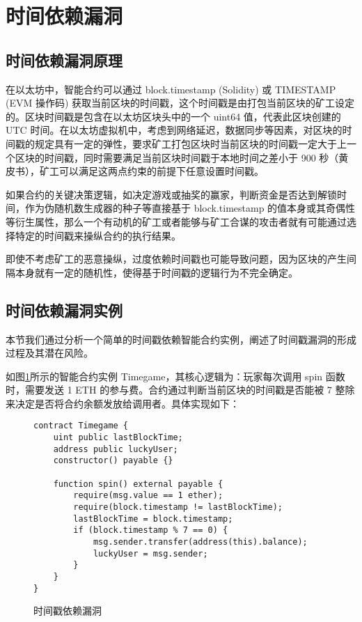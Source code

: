 \documentclass[print, master, vlined, timesmath]{DissertUESTC}
\begin{document}
\section{时间依赖漏洞}
\subsection{时间依赖漏洞原理}

在以太坊中，智能合约可以通过 block.timestamp (Solidity) 或 TIMESTAMP (EVM 操作码) 获取当前区块的时间戳，这个时间戳是由打包当前区块的矿工设定的。区块时间戳是包含在以太坊区块头中的一个 uint64 值，代表此区块创建的 UTC 时间。在以太坊虚拟机中，考虑到网络延迟，数据同步等因素，对区块的时间戳的规定具有一定的弹性，要求矿工打包区块时当前区块的时间戳一定大于上一个区块的时间戳，同时需要满足当前区块时间戳于本地时间之差小于 900 秒（黄皮书），矿工可以满足这两点约束的前提下任意设置时间戳。

如果合约的关键决策逻辑，如决定游戏或抽奖的赢家，判断资金是否达到解锁时间，作为伪随机数生成器的种子等直接基于 block.timestamp 的值本身或其奇偶性等衍生属性，那么一个有动机的矿工或者能够与矿工合谋的攻击者就有可能通过选择特定的时间戳来操纵合约的执行结果。

即使不考虑矿工的恶意操纵，过度依赖时间戳也可能导致问题，因为区块的产生间隔本身就有一定的随机性，使得基于时间戳的逻辑行为不完全确定。

\subsection{时间依赖漏洞实例}
本节我们通过分析一个简单的时间戳依赖智能合约实例，阐述了时间戳漏洞的形成过程及其潜在风险。

如图\ref{fig:timestamp-dependency}所示的智能合约实例 Timegame，其核心逻辑为：玩家每次调用 spin 函数时，需要发送 1 ETH 的参与费。合约通过判断当前区块的时间戳是否能被 7 整除来决定是否将合约余额发放给调用者。具体实现如下：

\begin{figure}[H]
    \centering
    \begin{minipage}{0.9\textwidth}
    \begin{verbatim}
contract Timegame {
    uint public lastBlockTime;
    address public luckyUser;
    constructor() payable {}

    function spin() external payable {
        require(msg.value == 1 ether);
        require(block.timestamp != lastBlockTime);
        lastBlockTime = block.timestamp;
        if (block.timestamp % 7 == 0) {
            msg.sender.transfer(address(this).balance);
            luckyUser = msg.sender;
        }
    }
}
    \end{verbatim}
    \end{minipage}
    \caption{时间戳依赖漏洞}
    \label{fig:timestamp-dependency}
\end{figure}
\end{document}
